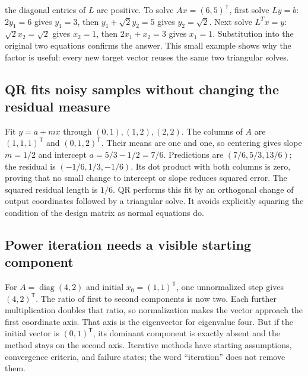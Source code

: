 the diagonal entries of \(L\) are positive. To solve \(Ax=(6,5)^\mathsf T\), first solve \(Ly=b\): \(2y_1=6\) gives \(y_1=3\), then \(y_1+\sqrt2y_2=5\) gives \(y_2=\sqrt2\). Next solve \(L^Tx=y\): \(\sqrt2x_2=\sqrt2\) gives \(x_2=1\), then \(2x_1+x_2=3\) gives \(x_1=1\). Substitution into the original two equations confirms the answer. This small example shows why the factor is useful: every new target vector reuses the same two triangular solves.

\subsection{QR fits noisy samples without changing the residual measure}\label{02-foundations-ii-ch038-qr-fits-noisy-samples-without-changing-the-residual-measure}

\hypertarget{02-foundations-ii-ch038-qr-fits-noisy-samples-without-changing-the-residual-measure}{}

Fit \(y=a+mx\) through \((0,1),(1,2),(2,2)\). The columns of \(A\) are \((1,1,1)^\mathsf T\) and \((0,1,2)^\mathsf T\). Their means are one and one, so centering gives slope \(m=1/2\) and intercept \(a=5/3-1/2=7/6\). Predictions are \((7/6,5/3,13/6)\); the residual is \((-1/6,1/3,-1/6)\). Its dot product with both columns is zero, proving that no small change to intercept or slope reduces squared error. The squared residual length is \(1/6\). QR performs this fit by an orthogonal change of output coordinates followed by a triangular solve. It avoids explicitly squaring the condition of the design matrix as normal equations do.

\subsection{Power iteration needs a visible starting component}\label{02-foundations-ii-ch038-power-iteration-needs-a-visible-starting-component}

\hypertarget{02-foundations-ii-ch038-power-iteration-needs-a-visible-starting-component}{}

For \(A=\operatorname{diag}(4,2)\) and initial \(x_0=(1,1)^\mathsf T\), one unnormalized step gives \((4,2)^\mathsf T\). The ratio of first to second components is now two. Each further multiplication doubles that ratio, so normalization makes the vector approach the first coordinate axis. That axis is the eigenvector for eigenvalue four. But if the initial vector is \((0,1)^\mathsf T\), its dominant component is exactly absent and the method stays on the second axis. Iterative methods have starting assumptions, convergence criteria, and failure states; the word ``iteration'' does not remove them.

